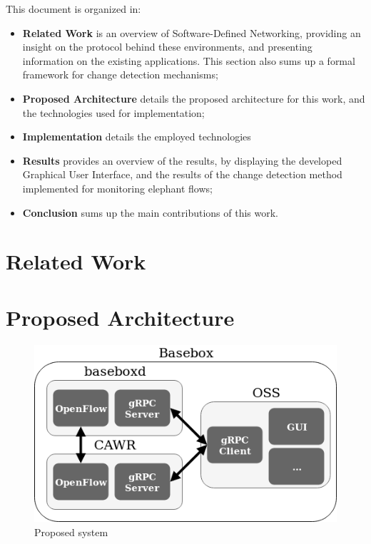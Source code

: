 \documentclass[a4paper]{IEEEtran}
\begin{document}
\par This document is organized in:

\begin{itemize}
    \item \textbf{Related Work} is an overview of Software-Defined Networking, providing an insight on the protocol behind these environments,
and presenting information on the existing applications. This section also sums up a formal framework for change detection mechanisms;
    \item \textbf{Proposed Architecture} details the proposed architecture for this work, and the technologies used for implementation;
    \item \textbf{Implementation} details the employed technologies
    \item \textbf{Results} provides an overview of the results, by displaying the developed Graphical User Interface, and the results of the change detection method
        implemented for monitoring elephant flows;
    \item \textbf{Conclusion} sums up the main contributions of this work.
\end{itemize}

\section{Related Work}

\section{Proposed Architecture}

\begin{figure}
    \includegraphics[scale=0.4]{../doc/figures/bisdn/prp_system_low_level.png}
    \caption{Proposed system}
    \label{fig:fig}
\end{figure}
\end{document}
